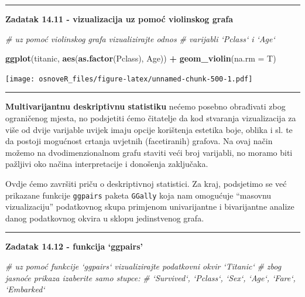 \documentclass[]{book}
\newenvironment{Shaded}{\begin{snugshade}}{\end{snugshade}}
\newcommand{\KeywordTok}[1]{\textcolor[rgb]{0.13,0.29,0.53}{\textbf{#1}}}
\newcommand{\DataTypeTok}[1]{\textcolor[rgb]{0.13,0.29,0.53}{#1}}
\newcommand{\StringTok}[1]{\textcolor[rgb]{0.31,0.60,0.02}{#1}}
\newcommand{\CommentTok}[1]{\textcolor[rgb]{0.56,0.35,0.01}{\textit{#1}}}
\newcommand{\OperatorTok}[1]{\textcolor[rgb]{0.81,0.36,0.00}{\textbf{#1}}}
\newcommand{\NormalTok}[1]{#1}
\theoremstyle{definition}
\theoremstyle{definition}
\theoremstyle{definition}
\theoremstyle{remark}
\begin{document}
\begin{center}\rule{0.5\linewidth}{\linethickness}\end{center}

\textbf{Zadatak 14.11 - vizualizacija uz pomoć violinskog grafa}

\begin{Shaded}
\begin{Highlighting}[]
\CommentTok{# uz pomoć violinskog grafa vizualizirajte odnos}
\CommentTok{#  varijabli `Pclass` i `Age`}
\end{Highlighting}
\end{Shaded}

\begin{Shaded}
\begin{Highlighting}[]
\KeywordTok{ggplot}\NormalTok{(titanic, }\KeywordTok{aes}\NormalTok{(}\KeywordTok{as.factor}\NormalTok{(Pclass), Age)) }\OperatorTok{+}\StringTok{ }\KeywordTok{geom_violin}\NormalTok{(}\DataTypeTok{na.rm =}\NormalTok{ T)}
\end{Highlighting}
\end{Shaded}

\texttt{[image: osnoveR\_files/figure-latex/unnamed-chunk-500-1.pdf]}

\begin{center}\rule{0.5\linewidth}{\linethickness}\end{center}

\textbf{Multivarijantnu deskriptivnu statistiku} nećemo posebno
obrađivati zbog ograničenog mjesta, no podsjetiti ćemo čitatelje da kod
stvaranja vizualizacija za više od dvije varijable uvijek imaju opcije
korištenja estetika boje, oblika i sl. te da postoji mogućnost crtanja
uvjetnih (facetiranih) grafova. Na ovaj način možemo na
dvodimenzionalnom grafu staviti veći broj varijabli, no moramo biti
pažljivi oko načina interpretacije i donošenja zaključaka.

Ovdje ćemo završiti priču o deskriptivnoj statistici. Za kraj,
podsjetimo se već prikazane funkcije \texttt{ggpairs} paketa
\texttt{GGally} koja nam omogućuje ``masovnu vizualizaciju'' podatkovnog
skupa primjenom univarijantne i bivarijantne analize danog podatkovnog
okvira u sklopu jedinstvenog grafa.

\begin{center}\rule{0.5\linewidth}{\linethickness}\end{center}

\textbf{Zadatak 14.12 - funkcija `ggpairs'}

\begin{Shaded}
\begin{Highlighting}[]
\CommentTok{# uz pomoć funkcije `ggpairs` vizualizirajte podatkovni okvir `Titanic`}
\CommentTok{# zbog jasnoće prikaza izaberite samo stupce:}
\CommentTok{#    `Survived`, `Pclass`, `Sex`, `Age`, `Fare`, `Embarked`}
\end{Highlighting}
\end{Shaded}
\end{document}
